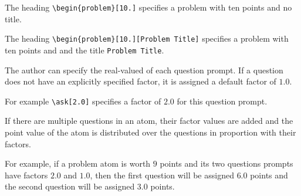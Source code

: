 \begin{cluster}
\label{grp:xmpl:quiz::heading}

\begin{example}
\label{xmpl:quiz::heading}
The heading
 \lstinline`\begin{problem}[10.]` specifies a problem with ten points
   and no title.

The heading
\lstinline`\begin{problem}[10.][Problem Title]` 
specifies a  problem with ten points and and the title
\lstinline`Problem Title`.

\end{example}
\end{cluster}

\begin{cluster}
\label{grp:grm:quiz::question-factors}

\begin{gram}
\label{grm:quiz::question-factors}
The author can specify the real-valued  of each question prompt.  
If a question does not have an explicitly specified factor, it is
assigned a default factor of $1.0$.

For example 
\lstinline`\ask[2.0]` 
specifies a factor of $2.0$ for this question prompt. 


If there are multiple questions in an atom, their factor values are
added and the point value of the atom is distributed over the
questions in proportion with their factors.

For example, if a problem atom is worth $9$ points and its two
questions prompts have factors $2.0$ and $1.0$, then the first
question will be assigned $6.0$ points and the second question will be
assigned $3.0$ points.

\end{gram}
\end{cluster}

